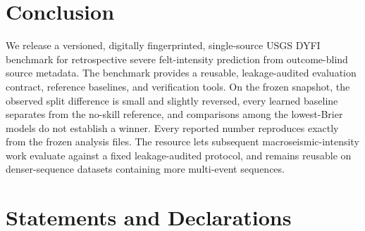 \documentclass[pdflatex,sn-basic,iicol]{sn-jnl}
\begin{document}
\section{Conclusion}\label{sec:conclusion}

We release a versioned, digitally fingerprinted, single-source USGS DYFI
benchmark for retrospective severe felt-intensity prediction from outcome-blind
source metadata. The benchmark provides a reusable, leakage-audited evaluation
contract, reference baselines, and verification tools. On the frozen snapshot, the observed
split difference is small and slightly reversed, every learned baseline
separates from the no-skill reference, and comparisons among the lowest-Brier
models do not establish a winner. Every reported number reproduces exactly from
the frozen analysis files. The resource lets subsequent macroseismic-intensity work evaluate
against a fixed leakage-audited protocol, and remains reusable on denser-sequence
datasets containing more multi-event sequences.

\backmatter

\section*{Statements and Declarations}
\end{document}

